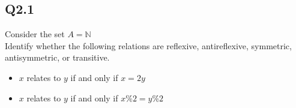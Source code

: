 \documentclass{article}
\begin{document}
\subsection*{Q2.1}
Consider the set $A=\mathbb{N}$
\\ Identify whether the following relations are reflexive, antireflexive, symmetric, antisymmetric, or transitive.
\begin{itemize}
    \item $x$ relates to $y$ if and only if $x=2y$ 
    \item $x$ relates to $y$ if and only if $x\%2=y\%2$
\end{itemize}
\newpage
\end{document}

